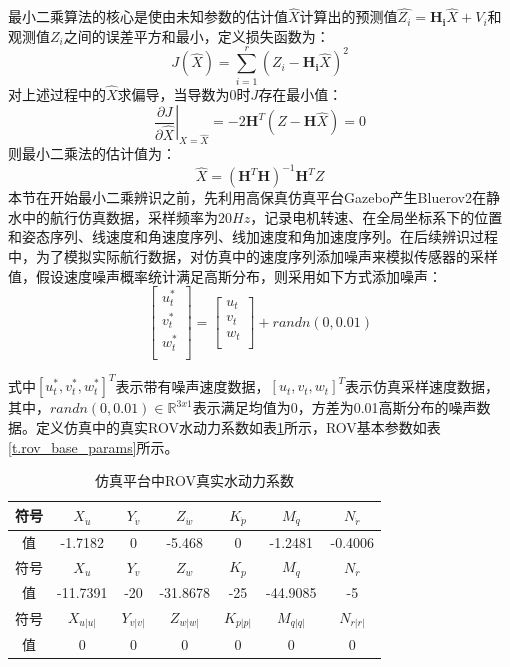 最小二乘算法的核心是使由未知参数的估计值$\hat{X}$计算出的预测值$\hat{Z_i}=\mathbf{H_i}\hat{X}+V_i$和观测值$Z_i$之间的误差平方和最小，定义损失函数为：
\begin{equation}
    J(\hat{X})=\sum_{i=1}^r(Z_i-\mathbf{H_i}\hat{X})^2
\end{equation}
对上述过程中的$\hat{X}$求偏导，当导数为$0$时$J$存在最小值：
\begin{equation}
    \left.\frac{\partial J}{\partial \hat{X}}\right|_{X=\hat{X}}=-2 \mathbf{H}^{T}(Z-\mathbf{H} \hat{X})=0
\end{equation}
则最小二乘法的估计值为：
\begin{equation}
    \hat{X}=(\mathbf{H}^T\mathbf{H})^{-1}\mathbf{H}^TZ
\end{equation}
本节在开始最小二乘辨识之前，先利用高保真仿真平台Gazebo产生Bluerov2在静水中的航行仿真数据，采样频率为$20Hz$，记录电机转速、在全局坐标系下的位置和姿态序列、线速度和角速度序列、线加速度和角加速度序列。在后续辨识过程中，为了模拟实际航行数据，对仿真中的速度序列添加噪声来模拟传感器的采样值，假设速度噪声概率统计满足高斯分布，则采用如下方式添加噪声：
\begin{equation}
\begin{bmatrix}
u_t^*\\
v_t^*\\
w_t^*\\
\end{bmatrix} = \begin{bmatrix}
u_t\\
v_t\\
w_t\\
\end{bmatrix} + randn(0,0.01)
\end{equation}

式中$[u_t^*,v_t^*,w_t^*]^T$表示带有噪声速度数据，$[u_t,v_t,w_t]^T$表示仿真采样速度数据，其中，$randn(0,0.01)\in \mathbb{R}^{3x1}$表示满足均值为0，方差为0.01高斯分布的噪声数据。定义仿真中的真实ROV水动力系数如表\ref{t.real_hydro_coff}所示，ROV基本参数如表\ref{t.rov_base_params}所示。
\begin{table}[htb]
  \centering
  \caption{仿真平台中ROV真实水动力系数}
  \label{t.real_hydro_coff}
  \begin{tabular}{ccccccc}
  \hline
符号 & $X_{\dot{u}}$ & $Y_{\dot{v}}$ & $Z_{\dot{w}}$ & $K_{\dot{p}}$ & $M_{\dot{q}}$ & $N_{\dot{r}}$ \\
\hline
值  & -1.7182         & 0         & -5.468        & 0         & -1.2481         & -0.4006         \\
\hline
\hline
符号 & $X_u$         & $Y_v$         & $Z_w$         & $K_p$         & $M_q$         & $N_r$         \\
\hline
值  & -11.7391         & -20         & -31.8678         & -25         & -44.9085         & -5         \\
\hline
\hline
符号 & $X_{u|u|}$    & $Y_{v|v|}$    & $Z_{w|w|}$    & $K_{p|p|}$    & $M_{q|q|}$    & $N_{r|r|}$    \\
\hline
值  & 0        & 0        & 0        & 0         & 0         & 0 \\  
\hline
\end{tabular}
\end{table}

